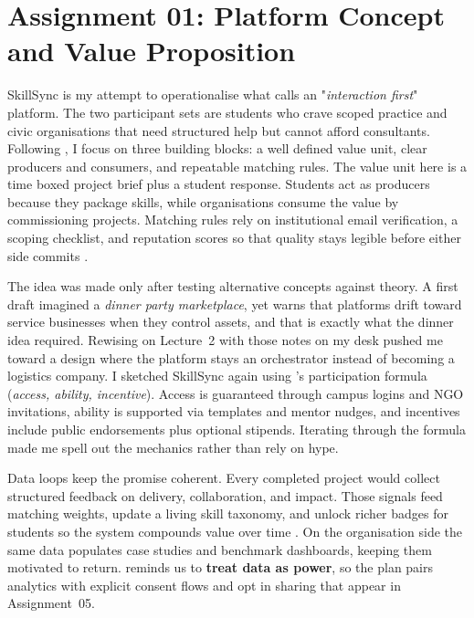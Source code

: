 \section*{Assignment 01: Platform Concept and Value Proposition}

SkillSync is my attempt to operationalise what \citet{Choudary2016} calls an "\textit{interaction first}" platform. The two participant sets are students who crave scoped practice and civic organisations that need structured help but cannot afford consultants. Following \citet{Choudary2016}, I focus on three building blocks: a well defined value unit, clear producers and consumers, and repeatable matching rules. The value unit here is a time boxed project brief plus a student response. Students act as producers because they package skills, while organisations consume the value by commissioning projects. Matching rules rely on institutional email verification, a scoping checklist, and reputation scores so that quality stays legible before either side commits \citep{Lecture02}.

The idea was made only after testing alternative concepts against theory. A first draft imagined a \textit{dinner party marketplace}, yet \citet{Srnicek2017} warns that platforms drift toward service businesses when they control assets, and that is exactly what the dinner idea required. Rewising on Lecture~2 with those notes on my desk pushed me toward a design where the platform stays an orchestrator instead of becoming a logistics company. I sketched SkillSync again using \citet{Choudary2016}'s participation formula (\textit{access, ability, incentive}). Access is guaranteed through campus logins and NGO invitations, ability is supported via templates and mentor nudges, and incentives include public endorsements plus optional stipends. Iterating through the formula made me spell out the mechanics rather than rely on hype.

Data loops keep the promise coherent. Every completed project would collect structured feedback on delivery, collaboration, and impact. Those signals feed matching weights, update a living skill taxonomy, and unlock richer badges for students so the system compounds value over time \citep{Lecture05}. On the organisation side the same data populates case studies and benchmark dashboards, keeping them motivated to return. \citet{Zuboff2019} reminds us to \textbf{treat data as power}, so the plan pairs analytics with explicit consent flows and opt in sharing that appear in Assignment~05.

